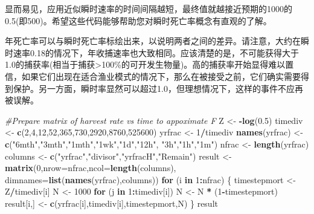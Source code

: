 \documentclass[
  lang=cn,
  11pt,
  scheme=chinese,
  chinesefont=nofont,
  citestyle=gb7714-2015,
  bibstyle=gb7714-2015]{elegantbook}
\newenvironment{Shaded}{\begin{snugshade}}{\end{snugshade}}
\newcommand{\AttributeTok}[1]{\textcolor[rgb]{0.13,0.29,0.53}{#1}}
\newcommand{\CommentTok}[1]{\textcolor[rgb]{0.56,0.35,0.01}{\textit{#1}}}
\newcommand{\ControlFlowTok}[1]{\textcolor[rgb]{0.13,0.29,0.53}{\textbf{#1}}}
\newcommand{\DecValTok}[1]{\textcolor[rgb]{0.00,0.00,0.81}{#1}}
\newcommand{\FloatTok}[1]{\textcolor[rgb]{0.00,0.00,0.81}{#1}}
\newcommand{\FunctionTok}[1]{\textcolor[rgb]{0.13,0.29,0.53}{\textbf{#1}}}
\newcommand{\NormalTok}[1]{#1}
\newcommand{\OtherTok}[1]{\textcolor[rgb]{0.56,0.35,0.01}{#1}}
\newcommand{\SpecialCharTok}[1]{\textcolor[rgb]{0.81,0.36,0.00}{\textbf{#1}}}
\newcommand{\StringTok}[1]{\textcolor[rgb]{0.31,0.60,0.02}{#1}}
\begin{document}
显而易见，应用近似瞬时速率的时间间隔越短，最终值就越接近预期的1000的0.5(即500)。希望这些代码能够帮助您对瞬时死亡率概念有直观的了解。

年死亡率可以与瞬时死亡率标绘出来，以说明两者之间的差异。请注意，大约在瞬时速率0.18的情况下，年收捕速率也大致相同。应该清楚的是，不可能获得大于1.0的捕获率(相当于捕获\textgreater100\%的可开发生物量)。高的捕获率开始显得难以置信，如果它们出现在适合渔业模式的情况下，那么在被接受之前，它们确实需要得到保护。另一方面，瞬时率显然可以超过1.0，但理想情况下，这样的事件不应再被误解。

\begin{Shaded}
\begin{Highlighting}[]
 \CommentTok{\#Prepare matrix of harvest rate vs time to appoximate F  }
\NormalTok{Z }\OtherTok{\textless{}{-}} \SpecialCharTok{{-}}\FunctionTok{log}\NormalTok{(}\FloatTok{0.5}\NormalTok{)  }
\NormalTok{timediv }\OtherTok{\textless{}{-}} \FunctionTok{c}\NormalTok{(}\DecValTok{2}\NormalTok{,}\DecValTok{4}\NormalTok{,}\DecValTok{12}\NormalTok{,}\DecValTok{52}\NormalTok{,}\DecValTok{365}\NormalTok{,}\DecValTok{730}\NormalTok{,}\DecValTok{2920}\NormalTok{,}\DecValTok{8760}\NormalTok{,}\DecValTok{525600}\NormalTok{)  }
\NormalTok{yrfrac }\OtherTok{\textless{}{-}} \DecValTok{1}\SpecialCharTok{/}\NormalTok{timediv  }
\FunctionTok{names}\NormalTok{(yrfrac) }\OtherTok{\textless{}{-}} \FunctionTok{c}\NormalTok{(}\StringTok{"6mth"}\NormalTok{,}\StringTok{"3mth"}\NormalTok{,}\StringTok{"1mth"}\NormalTok{,}\StringTok{"1wk"}\NormalTok{,}\StringTok{"1d"}\NormalTok{,}\StringTok{"12h"}\NormalTok{,  }
                   \StringTok{"3h"}\NormalTok{,}\StringTok{"1h"}\NormalTok{,}\StringTok{"1m"}\NormalTok{)  }
\NormalTok{nfrac }\OtherTok{\textless{}{-}} \FunctionTok{length}\NormalTok{(yrfrac)  }
\NormalTok{columns }\OtherTok{\textless{}{-}} \FunctionTok{c}\NormalTok{(}\StringTok{"yrfrac"}\NormalTok{,}\StringTok{"divisor"}\NormalTok{,}\StringTok{"yrfracH"}\NormalTok{,}\StringTok{"Remain"}\NormalTok{)  }
\NormalTok{result }\OtherTok{\textless{}{-}} \FunctionTok{matrix}\NormalTok{(}\DecValTok{0}\NormalTok{,}\AttributeTok{nrow=}\NormalTok{nfrac,}\AttributeTok{ncol=}\FunctionTok{length}\NormalTok{(columns),  }
                 \AttributeTok{dimnames=}\FunctionTok{list}\NormalTok{(}\FunctionTok{names}\NormalTok{(yrfrac),columns))  }
\ControlFlowTok{for}\NormalTok{ (i }\ControlFlowTok{in} \DecValTok{1}\SpecialCharTok{:}\NormalTok{nfrac) \{  }
\NormalTok{   timestepmort }\OtherTok{\textless{}{-}}\NormalTok{ Z}\SpecialCharTok{/}\NormalTok{timediv[i]   }
\NormalTok{   N }\OtherTok{\textless{}{-}} \DecValTok{1000}  
   \ControlFlowTok{for}\NormalTok{ (j }\ControlFlowTok{in} \DecValTok{1}\SpecialCharTok{:}\NormalTok{timediv[i]) N }\OtherTok{\textless{}{-}}\NormalTok{ N }\SpecialCharTok{*}\NormalTok{ (}\DecValTok{1}\SpecialCharTok{{-}}\NormalTok{timestepmort)  }
\NormalTok{   result[i,] }\OtherTok{\textless{}{-}} \FunctionTok{c}\NormalTok{(yrfrac[i],timediv[i],timestepmort,N)  }
\NormalTok{\}  }
\NormalTok{result}
\end{Highlighting}
\end{Shaded}
\end{document}
